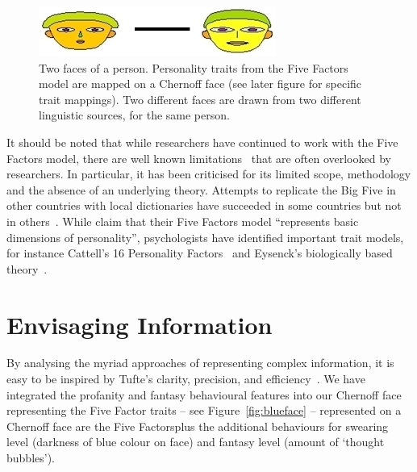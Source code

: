 \documentclass{AISB2008}
\begin{document}
\begin{figure}[!htb]
\centering
\includegraphics[width=\columnwidth]{images/newtwofaces.jpg}
\caption{Two faces of a person. Personality traits from the Five Factors model are mapped on a Chernoff face (see later figure for specific trait mappings). Two different faces are drawn from two different linguistic sources, for the same person.}
\label{fig:twofaces}
\end{figure}

It should be noted that while researchers have continued to work with
the Five Factors model, there are well known
limitations~\cite{eysenck:1992,paunonen+jackson:2000,block:2010} that
are often overlooked by researchers. In particular, it has been
criticised for its limited scope, methodology and the absence of an
underlying theory. Attempts to replicate the Big Five in other
countries with local dictionaries have succeeded in some countries but
not in others~\cite{szirmak+deraad:1994,defruyt-et-al:2004}. While
\cite{costa+mccrae:1992} claim that their Five Factors model
``represents basic dimensions of personality'', psychologists have
identified important trait models, for instance Cattell's 16
Personality Factors~\cite{cattell:1946} and Eysenck's biologically
based theory~\cite{eysenck:1947}.


\section{Envisaging Information}

By analysing the myriad approaches of representing complex
information, it is easy to be inspired by Tufte's clarity, precision,
and efficiency~\cite{tufte:2001,tufte:1997,tufte:1990}. We have
integrated the profanity and fantasy behavioural features into our
Chernoff face representing the Five Factor traits -- see
Figure~\ref{fig:blueface} -- represented on a Chernoff face are the
Five Factorsplus the additional behaviours for swearing level
(darkness of blue colour on face) and fantasy level (amount of
`thought bubbles').
\end{document}
